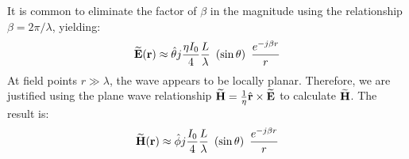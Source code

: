 It is common to eliminate the factor of $\beta$ in the magnitude using the relationship $\beta=2\pi/\lambda$, yielding:
%
\begin{equation}
\widetilde{\bf E}({\bf r}) \approx  \hat{\bf \theta} j \frac{\eta I_0}{4} \frac{L}{\lambda} ~\left(\sin\theta\right) ~\frac{e^{-j\beta r}}{r}
\end{equation}
%
At field points $r\gg\lambda$, the wave appears to be locally planar.
Therefore, we are justified using the plane wave relationship
$ \widetilde{\bf H} = \frac{1}{\eta} \hat{\bf r} \times \widetilde{\bf E} $
to calculate $\widetilde{\bf H}$.
The result is:
%
\begin{equation}
\widetilde{\bf H}({\bf r}) \approx \hat{\bf \phi} j \frac{I_0}{4} \frac{L}{\lambda} ~\left(\sin\theta\right) ~\frac{e^{-j\beta r}}{r}
\label{m0198_eESDH}
\end{equation}

